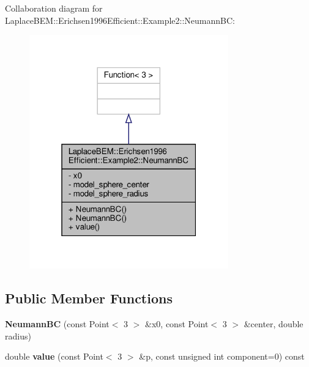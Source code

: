 Collaboration diagram for Laplace\+B\+EM\+:\+:Erichsen1996\+Efficient\+:\+:Example2\+:\+:Neumann\+BC\+:\nopagebreak
\begin{figure}[H]
\begin{center}
\leavevmode
\includegraphics[width=244pt]{classLaplaceBEM_1_1Erichsen1996Efficient_1_1Example2_1_1NeumannBC__coll__graph}
\end{center}
\end{figure}
\subsection*{Public Member Functions}
\begin{DoxyCompactItemize}
\item 
\mbox{\label{classLaplaceBEM_1_1Erichsen1996Efficient_1_1Example2_1_1NeumannBC_af03728f3f5a5e09a1d6e36aa0dea1c72}} 
{\bfseries Neumann\+BC} (const Point$<$ 3 $>$ \&x0, const Point$<$ 3 $>$ \&center, double radius)
\item 
\mbox{\label{classLaplaceBEM_1_1Erichsen1996Efficient_1_1Example2_1_1NeumannBC_aebf1e1dee97d780e504e96b350e88c17}} 
double {\bfseries value} (const Point$<$ 3 $>$ \&p, const unsigned int component=0) const
\end{DoxyCompactItemize}
